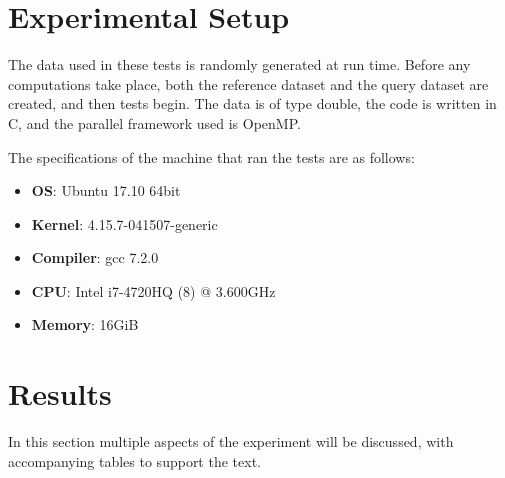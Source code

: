 \documentclass[a4paper,twoside,11pt]{report}
\begin{document}
\section*{Experimental Setup}

The data used in these tests is randomly generated at run time. Before any computations take place, both the reference dataset and the query dataset are created, and then tests begin. The data is of type double, the code is written in C, and the parallel framework used is OpenMP.

The specifications of the machine that ran the tests are as follows:
\begin{itemize}
	\item \textbf{OS}: Ubuntu 17.10 64bit
	\item \textbf{Kernel}: 4.15.7-041507-generic
	\item \textbf{Compiler}: gcc 7.2.0
	\item \textbf{CPU}: Intel i7-4720HQ (8) @ 3.600GHz
	\item \textbf{Memory}: 16GiB
\end{itemize}

\section*{Results}

In this section multiple aspects of the experiment will be discussed, with accompanying tables to support the text.
\end{document}
